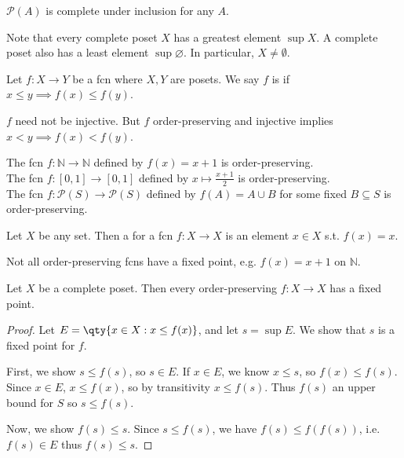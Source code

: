 \begin{example}
    $\mathcal P(A)$ is complete under inclusion for any $A$.
\end{example}

\begin{remark}
    Note that every complete poset $X$ has a greatest element $\sup X$.
    A complete poset also has a least element $\sup \varnothing$.
    In particular, $X \neq \emptyset$.
\end{remark}

\begin{definition}
    Let $f \colon X \to Y$ be a fcn where $X, Y$ are posets.
    We say $f$ is  if $x \leq y \implies f(x) \leq f(y)$.
\end{definition}

\begin{note}
    $f$ need not be injective.
    But $f$ order-preserving and injective implies $x < y \implies f(x) < f(y)$.
\end{note}

\begin{example}
    The fcn $f \colon \mathbb N \to \mathbb N$ defined by $f(x) = x + 1$ is order-preserving. \\
    The fcn $f \colon [0,1] \to [0,1]$ defined by $x \mapsto \frac{x+1}{2}$ is order-preserving. \\
    The fcn $f \colon \mathcal P(S) \to \mathcal P(S)$ defined by $f(A) = A \cup B$ for some fixed $B \subseteq S$ is order-preserving.
\end{example}

\begin{definition}
    Let $X$ be any set.
    Then a  for a fcn $f : X \to X$ is an element $x \in X$ s.t. $f(x) = x$.
\end{definition}

Not all order-preserving fcns have a fixed point, e.g. $f(x) = x + 1$ on $\mathbb N$.

\begin{theorem} \label{thm:fixed}
    Let $X$ be a complete poset.
    Then every order-preserving $f \colon X \to X$ has a fixed point.
\end{theorem}

\begin{proof}
    Let $E = \qty{x \in X : x \leq f(x)}$, and let $s = \sup E$.
    We show that $s$ is a fixed point for $f$.

    First, we show $s \leq f(s)$, so $s \in E$.
    If $x \in E$, we know $x \leq s$, so $f(x) \leq f(s)$.
    Since $x \in E$, $x \leq f(x)$, so by transitivity $x \leq f(s)$.
    Thus $f(s)$ an upper bound for $S$ so $s \leq f(s)$.

    Now, we show $f(s) \leq s$.
    Since $s \leq f(s)$, we have $f(s) \leq f(f(s))$, i.e. $f(s) \in E$ thus $f(s) \leq s$.
\end{proof}

